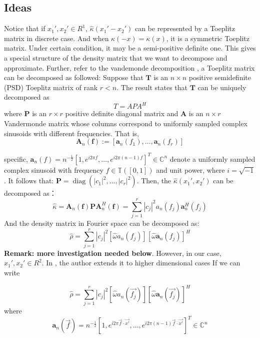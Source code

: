 \documentclass{article}
\numberwithin{equation}{section}
\begin{document}
  
  \subsection{Ideas}
  Notice that if $x_1',x_2'\in R^1$, $\hat{\kappa}(x_1' - x_2')$ can be represented by a Toeplitz matrix in discrete case. And when $\kappa(-x) = \kappa(x) $, it is a symmetric Toeplitz matrix. Under certain condition, it may be a semi-positive definite one. This gives a special structure of the density matrix that we want to decompose and approximate. Further, refer to the vandemonde decomposition \cite{multilevel vandemonde decomposition}, a Toeplitz matrix can be decomposed as followed:
   	Suppose that $\boldsymbol{T}$ is an $n \times n$ positive semidefinite (PSD) Toeplitz matrix of rank $r<n$. The result states that $\boldsymbol{T}$ can be uniquely decomposed as
  	$$
  	T=A P A^{H}
  	$$
  	where $\boldsymbol{P}$ is an $r \times r$ positive definite diagonal matrix and $\boldsymbol{A}$ is an $n \times r$ Vandermonde matrix whose columns correspond to uniformly sampled complex sinusoids with different frequencies. That is, 
  	$$
  	\boldsymbol{A}_{n}(\boldsymbol{f}):=\left[\boldsymbol{a}_{n}\left(f_{1}\right), \ldots, \boldsymbol{a}_{n}\left(f_{r}\right)\right]
  	$$

specific,  $\boldsymbol{a}_{n}(f)=n^{-\frac{1}{2}}\left[1, e^{i 2 \pi f}, \ldots, e^{i 2 \pi(n-1) f}\right]^{T} \in \mathbb{C}^{n}$ denote a uniformly sampled complex sinusoid with frequency $f \in \mathbb{T} ([0,1])$ and unit power, where $i=\sqrt{-1}$. 
It follows that:
$\boldsymbol{P}=\operatorname{diag}\left(\left|c_{1}\right|^{2}, \ldots,\left|c_{r}\right|^{2}\right)$. Then, the $\hat{\kappa}(x_1',x_2')$ can be decomposed as：
$$
\hat{\kappa}=\boldsymbol{A}_{n}(\boldsymbol{f}) \boldsymbol{P} \boldsymbol{A}_{n}^{H}(\boldsymbol{f})=\sum_{j=1}^{r}\left|c_{j}\right|^{2} a_{n}\left(f_{j}\right) \boldsymbol{a}_{n}^{H}\left(f_{j}\right)
$$
And the density matrix in Fourier space can be decomposed as:
$$
\hat{\rho} = \sum_{j=1}^{r}\left|c_{j}\right|^{2} [\hat{\omega} a_{n}\left(f_{j}\right)][\hat{\omega} \boldsymbol{a}_{n}\left(f_{j}\right)]^{H}
$$
\textbf{Remark: more investigation needed below}. 
However, in our case, $x_1',x_2' \in R^2$. In \cite{multilevel vandemonde decomposition}, the author extends it to higher dimensional cases 
If we can write

$$
\hat{\rho} = \sum_{j=1}^{r}\left|c_{j}\right|^{2} [\hat{\omega} a_{n}\left(\overrightarrow{f_{j}}\right)][\hat{\omega} \boldsymbol{a}_{n}\left(\overrightarrow{f_{j}}\right)]^{H}
$$
where
 $$
\boldsymbol{a}_{n}(\overrightarrow{f})=n^{-\frac{1}{2}}\left[1, e^{i 2 \pi \overrightarrow{f} \cdot \overrightarrow{x'}} , \ldots, e^{i 2 \pi(n-1) \overrightarrow{f} \cdot \overrightarrow{x'} } \right]^{T} \in \mathbb{C}^{n}
$$ 
\end{document}
